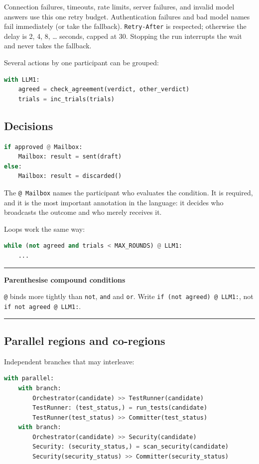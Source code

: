 \documentclass[11pt,a4paper]{article}
\newenvironment{warningbox}[1]
{\begin{center}\begin{minipage}{0.94\linewidth}
 \color{WarningBorder}\hrule\vspace{5pt}
 \color{ZipperInk}\textbf{#1}\par\smallskip}
{\vspace{5pt}\color{WarningBorder}\hrule\end{minipage}\end{center}}
\begin{document}
Connection failures, timeouts, rate limits, server failures, and invalid model
answers use this one retry budget. Authentication failures and bad model names
fail immediately (or take the fallback). \texttt{Retry-After} is respected;
otherwise the delay is 2, 4, 8, \ldots{} seconds, capped at 30. Stopping the
run interrupts the wait and never takes the fallback.

Several actions by one participant can be grouped:

\begin{lstlisting}[language=Python]
with LLM1:
    agreed = check_agreement(verdict, other_verdict)
    trials = inc_trials(trials)
\end{lstlisting}

\subsection{Decisions}

\begin{lstlisting}[language=Python]
if approved @ Mailbox:
    Mailbox: result = sent(draft)
else:
    Mailbox: result = discarded()
\end{lstlisting}

The \texttt{@ Mailbox} names the participant who evaluates the condition. It is
required, and it is the most important annotation in the language: it decides
who broadcasts the outcome and who merely receives it.

Loops work the same way:

\begin{lstlisting}[language=Python]
while (not agreed and trials < MAX_ROUNDS) @ LLM1:
    ...
\end{lstlisting}

\begin{warningbox}{Parenthesise compound conditions}
\texttt{@} binds more tightly than \texttt{not}, \texttt{and} and \texttt{or}.
Write \texttt{if (not agreed) @ LLM1:}, not \texttt{if not agreed @ LLM1:}.
\end{warningbox}

\subsection{Parallel regions and co-regions}

Independent branches that may interleave:

\begin{lstlisting}[language=Python]
with parallel:
    with branch:
        Orchestrator(candidate) >> TestRunner(candidate)
        TestRunner: (test_status,) = run_tests(candidate)
        TestRunner(test_status) >> Committer(test_status)
    with branch:
        Orchestrator(candidate) >> Security(candidate)
        Security: (security_status,) = scan_security(candidate)
        Security(security_status) >> Committer(security_status)
\end{lstlisting}
\end{document}
